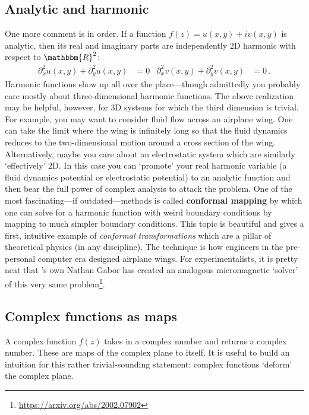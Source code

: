 \subsection{Analytic and harmonic}

One more comment is in order. If a function $f(z) = u(x,y)+ i v(x,y)$ is analytic, then its real and imaginary parts are independently 2D harmonic with respect to $\mathbbm{R}^2$:
\begin{align}
	\partial_x^2 u(x,y) + \partial_y^2 u(x,y) &= 0
	&
	\partial_x^2 v(x,y) + \partial_y^2 v(x,y) &= 0 \ .
\end{align}
Harmonic functions show up all over the place---though admittedly you probably care mostly about three-dimensional harmonic functions. The above realization may be helpful, however, for 3D systems for which the third dimension is trivial. For example, you may want to consider fluid flow across an airplane wing. One can take the limit where the wing is infinitely long so that the fluid dynamics reduces to the two-dimensional motion around a cross section of the wing. Alternatively, maybe you care about an electrostatic system which are similarly `effectively' 2D. In this case you can `promote' your real harmonic variable (a fluid dynamics potential or electrostatic potential) to an analytic function and then bear the full power of complex analysis to attack the problem. One of the most fascinating---if outdated---methods is called \textbf{conformal mapping} by which one can solve for a harmonic function with weird boundary conditions by mapping to much simpler boundary conditions. This topic is beautiful and gives a first, intuitive example of \emph{conformal transformations} which are a pillar of theoretical physics (in any discipline). The technique is how engineers in the pre-personal computer era designed airplane wings. For experimentalists, it is pretty neat that 's own Nathan Gabor has created an analogous micromagnetic `solver' of this very same problem\footnote{\url{https://arxiv.org/abs/2002.07902}}.

\subsection{Complex functions as maps}

A complex function $f(z)$ takes in a complex number and returns a complex number. These are maps of the complex plane to itself. It is useful to build an intuition for this rather trivial-sounding statement: complex functions `deform' the complex plane. 

